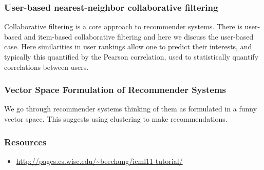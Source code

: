 



\subsubsection{User-based nearest-neighbor collaborative
filtering}\label{user-based-nearest-neighbor-collaborative-filtering}

Collaborative filtering is a core approach to recommender systems. There
is user-based and item-based collaborative filtering and here we discuss
the user-based case. Here similarities in user rankings allow one to
predict their interests, and typically this quantified by the Pearson
correlation, used to statistically quantify correlations between users.




\subsubsection{Vector Space Formulation of Recommender
Systems}\label{vector-space-formulation-of-recommender-systems}

We go through recommender systems thinking of them as formulated in a
funny vector space. This suggests using clustering to make
recommendations.



\subsubsection{Resources}\label{resources-1}

\begin{itemize}

\item
  \url{http://pages.cs.wisc.edu/~beechung/icml11-tutorial/}
\end{itemize}

